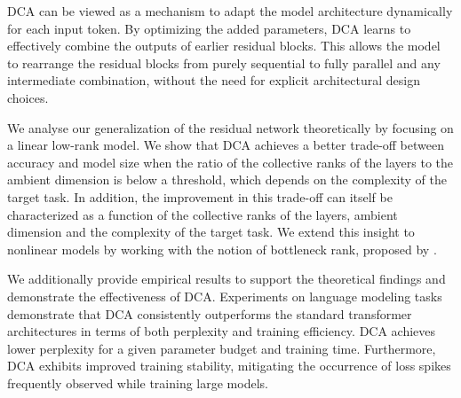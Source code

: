 DCA can be viewed as a mechanism to adapt the model architecture dynamically for each input token. By optimizing the added parameters, DCA learns to effectively combine the outputs of earlier residual blocks. This allows the model to rearrange the residual blocks from purely sequential to fully parallel and any intermediate combination, without the need for explicit architectural design choices.



We analyse our generalization of the residual network theoretically by focusing on a linear low-rank model. We show that DCA achieves a better trade-off between accuracy and model size when the ratio of the collective ranks of the layers to the ambient dimension is below a threshold, which depends on the complexity of the target task. In addition, the improvement in this trade-off can itself be characterized as a function of the collective ranks of the layers, ambient dimension and the complexity of the target task. We extend this insight to nonlinear models by working with the notion of bottleneck rank, proposed by \citet{jacot2022implicit}. 

We additionally provide empirical results to support the theoretical findings and demonstrate the effectiveness of DCA. Experiments on language modeling tasks demonstrate that DCA consistently outperforms the standard transformer architectures in terms of both perplexity and training efficiency. DCA achieves lower perplexity for a given parameter budget and training time. Furthermore, DCA exhibits improved training stability, mitigating the occurrence of loss spikes frequently observed while training large models.


